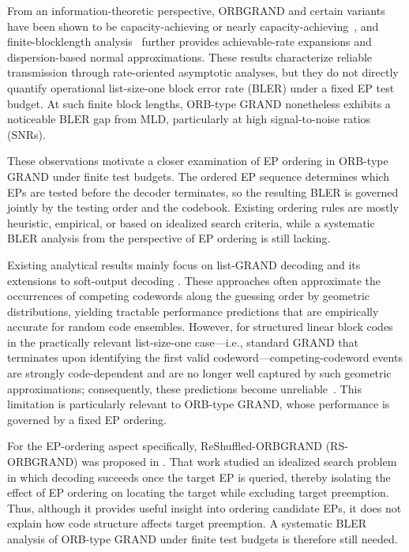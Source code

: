 \documentclass[letterpaper,draftclsnofoot,onecolumn]{IEEEtran}
\begin{document}
From an information-theoretic perspective, ORBGRAND and certain variants have been shown to be capacity-achieving or nearly capacity-achieving~\cite{liu2022orbgrand,li2024orbgrand,li2025orbgrand}, and finite-blocklength analysis~\cite{li2026finite} further provides achievable-rate expansions and dispersion-based normal approximations. These results characterize reliable transmission through rate-oriented asymptotic analyses, but they do not directly quantify operational list-size-one block error rate (BLER) under a fixed EP test budget. At such finite block lengths, ORB-type GRAND nonetheless exhibits a noticeable BLER gap from MLD, particularly at high signal-to-noise ratios (SNRs).


These observations motivate a closer examination of EP ordering in ORB-type GRAND under finite test budgets. The ordered EP sequence determines which EPs are tested before the decoder terminates, so the resulting BLER is governed jointly by the testing order and the codebook. Existing ordering rules are mostly heuristic, empirical, or based on idealized search criteria, while a systematic BLER analysis from the perspective of EP ordering is still lacking.


Existing analytical results mainly focus on list-GRAND decoding and its extensions to soft-output decoding \cite{abbas2022list,galligan2023upgrade,yuan2024softoutput}. These approaches often approximate the occurrences of competing codewords along the guessing order by geometric distributions, yielding tractable performance predictions that are empirically accurate for random code ensembles. However, for structured linear block codes in the practically relevant list-size-one case---i.e., standard GRAND that terminates upon identifying the first valid codeword---competing-codeword events are strongly code-dependent and are no longer well captured by such geometric approximations; consequently, these predictions become unreliable~\cite{duffy2024soft}. This limitation is particularly relevant to ORB-type GRAND, whose performance is governed by a fixed EP ordering.

For the EP-ordering aspect specifically, ReShuffled-ORBGRAND (RS-ORBGRAND) was proposed in \cite{wan2024approaching}. That work studied an idealized search problem in which decoding succeeds once the target EP is queried, thereby isolating the effect of EP ordering on locating the target while excluding target preemption. Thus, although it provides useful insight into ordering candidate EPs, it does not explain how code structure affects target preemption. A systematic BLER analysis of ORB-type GRAND under finite test budgets is therefore still needed.
\end{document}
